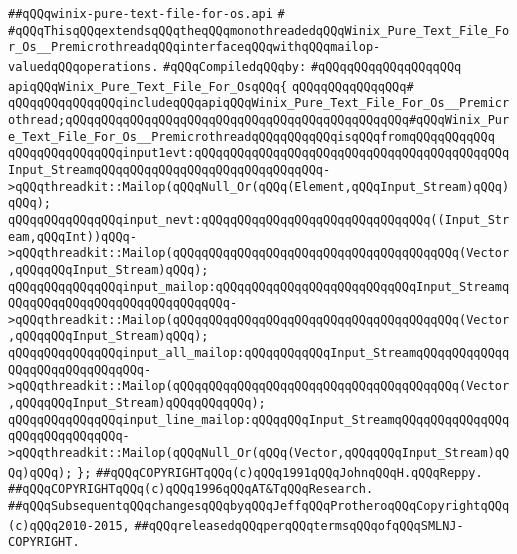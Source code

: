 \label{src/lib/std/src/io/winix-pure-text-file-for-os.api}
\verb|##qQQqwinix-pure-text-file-for-os.api|\newline
\verb|#|\newline
\verb|#qQQqThisqQQqextendsqQQqtheqQQqmonothreadedqQQqWinix_Pure_Text_File_For_Os__PremicrothreadqQQqinterfaceqQQqwithqQQqmailop-valuedqQQqoperations.|\newline
\newline
\verb|#qQQqCompiledqQQqby:|\newline
\verb|#qQQqqQQqqQQqqQQqqQQq|\newline
\newline
\newline
\verb|apiqQQqWinix_Pure_Text_File_For_OsqQQq{|\newline
\verb|qQQqqQQqqQQqqQQq#|\newline
\verb|qQQqqQQqqQQqqQQqincludeqQQqapiqQQqWinix_Pure_Text_File_For_Os__Premicrothread;qQQqqQQqqQQqqQQqqQQqqQQqqQQqqQQqqQQqqQQqqQQqqQQq#qQQqWinix_Pure_Text_File_For_Os__PremicrothreadqQQqqQQqqQQqisqQQqfromqQQqqQQqqQQq|\newline
\newline
\verb|qQQqqQQqqQQqqQQqinput1evt:qQQqqQQqqQQqqQQqqQQqqQQqqQQqqQQqqQQqqQQqqQQqInput_StreamqQQqqQQqqQQqqQQqqQQqqQQqqQQqqQQq->qQQqthreadkit::Mailop(qQQqNull_Or(qQQq(Element,qQQqInput_Stream)qQQq)qQQq);|\newline
\verb|qQQqqQQqqQQqqQQqinput_nevt:qQQqqQQqqQQqqQQqqQQqqQQqqQQqqQQq((Input_Stream,qQQqInt))qQQq->qQQqthreadkit::Mailop(qQQqqQQqqQQqqQQqqQQqqQQqqQQqqQQqqQQqqQQq(Vector,qQQqqQQqInput_Stream)qQQq);|\newline
\verb|qQQqqQQqqQQqqQQqinput_mailop:qQQqqQQqqQQqqQQqqQQqqQQqqQQqInput_StreamqQQqqQQqqQQqqQQqqQQqqQQqqQQqqQQq->qQQqthreadkit::Mailop(qQQqqQQqqQQqqQQqqQQqqQQqqQQqqQQqqQQqqQQq(Vector,qQQqqQQqInput_Stream)qQQq);|\newline
\verb|qQQqqQQqqQQqqQQqinput_all_mailop:qQQqqQQqqQQqInput_StreamqQQqqQQqqQQqqQQqqQQqqQQqqQQqqQQq->qQQqthreadkit::Mailop(qQQqqQQqqQQqqQQqqQQqqQQqqQQqqQQqqQQqqQQq(Vector,qQQqqQQqInput_Stream)qQQqqQQqqQQq);|\newline
\verb|qQQqqQQqqQQqqQQqinput_line_mailop:qQQqqQQqInput_StreamqQQqqQQqqQQqqQQqqQQqqQQqqQQqqQQq->qQQqthreadkit::Mailop(qQQqNull_Or(qQQq(Vector,qQQqqQQqInput_Stream)qQQq)qQQq);|\newline
\newline
\verb|};|\newline
\newline
\newline
\verb|##qQQqCOPYRIGHTqQQq(c)qQQq1991qQQqJohnqQQqH.qQQqReppy.|\newline
\verb|##qQQqCOPYRIGHTqQQq(c)qQQq1996qQQqAT&TqQQqResearch.|\newline
\verb|##qQQqSubsequentqQQqchangesqQQqbyqQQqJeffqQQqProtheroqQQqCopyrightqQQq(c)qQQq2010-2015,|\newline
\verb|##qQQqreleasedqQQqperqQQqtermsqQQqofqQQqSMLNJ-COPYRIGHT.|\newline

